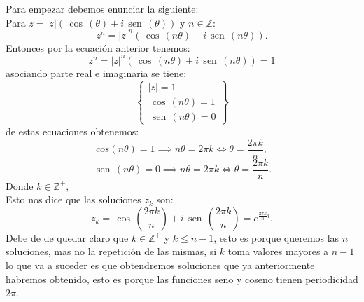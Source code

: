 \documentclass[twoside]{book}
\renewcommand{\sin}{\,\operatorname{sen}\,}
\renewcommand{\cos}{\,\operatorname{cos}\,}
\begin{document}
\begin{sol}
    \begin{solucion}{}
        Para empezar debemos enunciar la siguiente:\\
        Para $z=|z|\left(\cos(\theta)+i\sin(\theta)\right)$ y $n\in\mathbb{Z}:$
        \begin{equation}\label{formula_moivre}
            z^n=|z|^n\left(\cos(n\theta)+i\sin(n\theta)\right).
        \end{equation}
        Entonces por la ecuaci\'on anterior tenemos:
        $$z^n=|z|^n\left(\cos(n\theta)+i\sin(n\theta)\right)=1$$
        asociando parte real e imaginaria se tiene:
        \[
            \left\{\begin{array}{lr}
                |z|=1           \\
                \cos(n\theta)=1 \\
                \sin(n\theta)=0
            \end{array}\right\}
        \]
        de estas ecuaciones obtenemos:
        $$cos(n\theta)=1\implies n\theta=2\pi k \iff \theta=\dfrac{2\pi k}{n},$$
        $$\sin(n\theta)=0 \implies n\theta=2\pi k \iff \theta=\dfrac{2\pi k}{n}.$$
        Donde $k\in\mathbb{Z}^+,$\\
        Esto nos dice que las soluciones $z_k$ son:
        $$\boxed{z_k=\cos\left(\dfrac{2\pi k}{n}\right
            )+i\sin\left(\dfrac{2\pi k}{n}\right
            )=e^{\frac{2\pi k}{n}i}}.$$
        Debe de de quedar claro que $k\in\mathbb{Z}^+$ y $k\leq n-1$, esto es porque queremos las $n$ soluciones, mas no la repetici\'on de las mismas, si $k$ toma valores mayores a $n-1$ lo que va a suceder es que obtendremos soluciones que ya anteriormente habremos obtenido, esto es porque las funciones seno y coseno tienen periodicidad $2\pi$.

    \end{solucion}
\end{sol}
\end{document}
